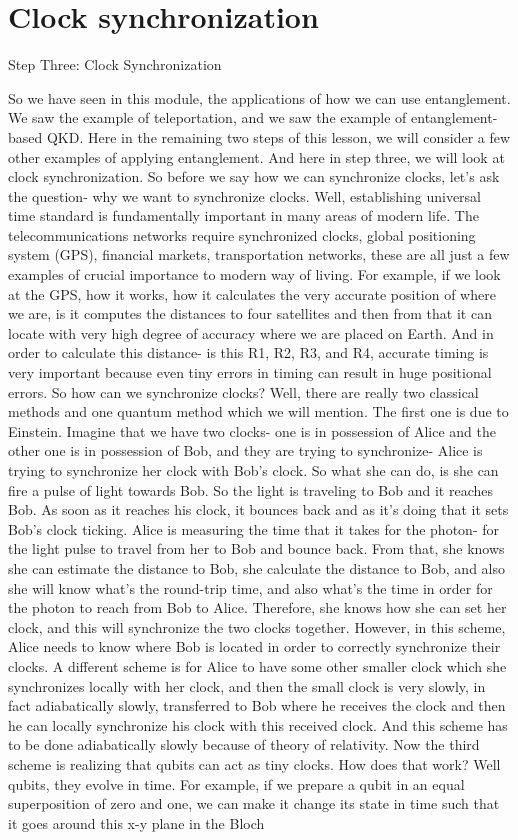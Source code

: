 \section{Clock synchronization}

Step Three: Clock Synchronization

So we have seen in this module, the applications of how we can use entanglement. We saw the example of teleportation, and we saw the example of entanglement-based QKD. Here in the remaining two steps of this lesson, we will consider a few other examples of applying entanglement. And here in step three, we will look at clock synchronization. So before we say how we can synchronize clocks, let's ask the question- why we want to synchronize clocks. Well, establishing universal time standard is fundamentally important in many areas of modern life. The telecommunications networks require synchronized clocks, global positioning system (GPS), financial markets, transportation networks, these are all just a few examples of crucial importance to modern way of living. For example, if we look at the GPS, how it works, how it calculates the very accurate position of where we are, is it computes the distances to four satellites and then from that it can locate with very high degree of accuracy where we are placed on Earth. And in order to calculate this distance- is this R1, R2, R3, and R4, accurate timing is very important because even tiny errors in timing can result in huge positional errors. So how can we synchronize clocks? Well, there are really two classical methods and one quantum method which we will mention. The first one is due to Einstein. Imagine that we have two clocks- one is in possession of Alice and the other one is in possession of Bob, and they are trying to synchronize- Alice is trying to synchronize her clock with Bob's clock. So what she can do, is she can fire a pulse of light towards Bob. So the light is traveling to Bob and it reaches Bob. As soon as it reaches his clock, it bounces back and as it's doing that it sets Bob's clock ticking. Alice is measuring the time that it takes for the photon- for the light pulse to travel from her to Bob and bounce back. From that, she knows she can estimate the distance to Bob, she calculate the distance to Bob, and also she will know what's the round-trip time, and also what's the time in order for the photon to reach from Bob to Alice. Therefore, she knows how she can set her clock, and this will synchronize the two clocks together. However, in this scheme, Alice needs to know where Bob is located in order to correctly synchronize their clocks. A different scheme is for Alice to have some other smaller clock which she synchronizes locally with her clock, and then the small clock is very slowly, in fact adiabatically slowly, transferred to Bob where he receives the clock and then he can locally synchronize his clock with this received clock. And this scheme has to be done adiabatically slowly because of theory of relativity. Now the third scheme is realizing that qubits can act as tiny clocks. How does that work? Well qubits, they evolve in time. For example, if we prepare a qubit in an equal superposition of zero and one, we can make it change its state in time such that it goes around this x-y plane in the Bloch 